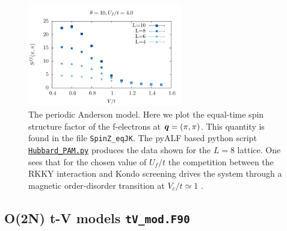 \begin{figure}
\center
\includegraphics[width=0.6\textwidth]{Figures/PAM/PAM.pdf}

\caption{The periodic Anderson model.  Here we  plot the  equal-time spin structure factor  of the f-electrons  at $\boldsymbol{q} = (\pi,\pi)$.   This quantity is found in the file \texttt{SpinZ\_eqJK}.  The  pyALF  based python script    \href{https://git.physik.uni-wuerzburg.de/ALF/pyALF/-/blob/master/Scripts/Hubbard_PAM.py}{\texttt{Hubbard\_PAM.py}}  produces the data  shown for the $L=8$ lattice.    One sees  that for the chosen value of $U_f/t$  the competition between the RKKY interaction and  Kondo screening drives the system through a magnetic order-disorder transition at $V_c/t \simeq 1$  \cite{Vekic95}.}
        \label{Fig:PAM}
\end{figure}





\subsection{O(2N)  t-V models  \texttt{tV\_mod.F90}}

